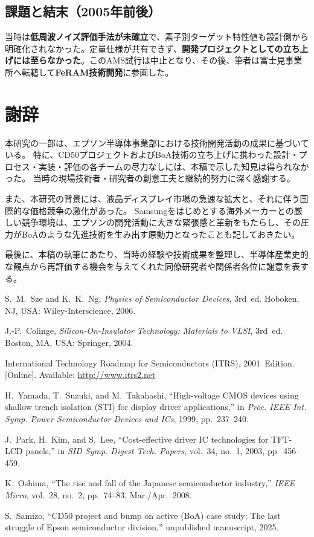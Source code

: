 \documentclass[conference]{IEEEtran}
\begin{document}
\subsection*{課題と結末（2005年前後）}
当時は\textbf{低周波ノイズ評価手法が未確立}で、素子別ターゲット特性値も設計側から明確化されなかった。定量仕様が共有できず、\textbf{開発プロジェクトとしての立ち上げには至らなかった}。このAMS試行は中止となり、その後、筆者は富士見事業所へ転籍して\textbf{FeRAM技術開発}に参画した。

\section*{謝辞}
本研究の一部は、エプソン半導体事業部における技術開発活動の成果に基づいている。  
特に、CD50プロジェクトおよびBoA技術の立ち上げに携わった設計・プロセス・実装・評価の各チームの尽力なしには、本稿で示した知見は得られなかった。  
当時の現場技術者・研究者の創意工夫と継続的努力に深く感謝する。  

また、本研究の背景には、液晶ディスプレイ市場の急速な拡大と、それに伴う国際的な価格競争の激化があった。  
Samsungをはじめとする海外メーカーとの厳しい競争環境は、エプソンの開発活動に大きな緊張感と革新をもたらし、その圧力がBoAのような先進技術を生み出す原動力となったことも記しておきたい。  

最後に、本稿の執筆にあたり、当時の経験や技術成果を整理し、半導体産業史的な観点から再評価する機会を与えてくれた同僚研究者や関係者各位に謝意を表する。

\begin{thebibliography}{99}

S.~M.~Sze and K.~K.~Ng, \textit{Physics of Semiconductor Devices}, 3rd~ed. Hoboken, NJ, USA: Wiley-Interscience, 2006.

J.-P.~Colinge, \textit{Silicon-On-Insulator Technology: Materials to VLSI}, 3rd~ed. Boston, MA, USA: Springer, 2004.

International Technology Roadmap for Semiconductors (ITRS), 2001~Edition. [Online]. Available: \url{http://www.itrs2.net}

H.~Yamada, T.~Suzuki, and M.~Takahashi, ``High-voltage CMOS devices using shallow trench isolation (STI) for display driver applications,'' in \textit{Proc. IEEE Int. Symp. Power Semiconductor Devices and ICs}, 1999, pp.~237--240.

J.~Park, H.~Kim, and S.~Lee, ``Cost-effective driver IC technologies for TFT-LCD panels,'' in \textit{SID Symp. Digest Tech. Papers}, vol.~34, no.~1, 2003, pp.~456--459.

K.~Oshima, ``The rise and fall of the Japanese semiconductor industry,'' \textit{IEEE Micro}, vol.~28, no.~2, pp.~74--83, Mar./Apr.~2008.

S.~Samizo, ``CD50 project and bump on active (BoA) case study: The last struggle of Epson semiconductor division,'' unpublished manuscript, 2025.

\end{thebibliography}
\end{document}
